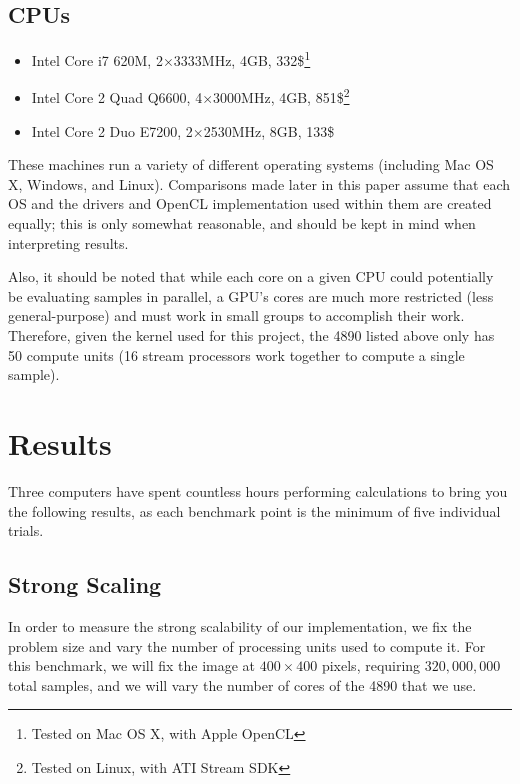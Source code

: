 \documentclass{acmsiggraph}
\begin{document}
\subsection{CPUs}

\begin{itemize}

\item Intel Core i7 620M, 2$\times$3333MHz, 4GB, 332\$\footnote{Tested on Mac OS X, with Apple OpenCL\label{fn:osx}}

\item Intel Core 2 Quad Q6600, 4$\times$3000MHz, 4GB, 851\$\footnote{Tested on Linux, with ATI Stream SDK\label{fn:linux}}

\item Intel Core 2 Duo E7200, 2$\times$2530MHz, 8GB, 133\$

\end{itemize}

These machines run a variety of different operating systems (including Mac OS X, Windows, and Linux). Comparisons made later in this paper assume that each OS and the drivers and OpenCL implementation used within them are created equally; this is only somewhat reasonable, and should be kept in mind when interpreting results.

Also, it should be noted that while each core on a given CPU could potentially be evaluating samples in parallel, a GPU's cores are much more restricted (less general-purpose) and must work in small groups to accomplish their work. Therefore, given the kernel used for this project, the 4890 listed above only has 50 compute units (16 stream processors work together to compute a single sample).

\section{Results}

Three computers have spent countless hours performing calculations to bring you the following results, as each benchmark point is the minimum of five individual trials.

\subsection{Strong Scaling}

\label{strongScaling}

In order to measure the strong scalability of our implementation, we fix the problem size and vary the number of processing units used to compute it. For this benchmark, we will fix the image at $400\times400$ pixels, requiring $320,000,000$ total samples, and we will vary the number of cores of the 4890 that we use.
\end{document}
